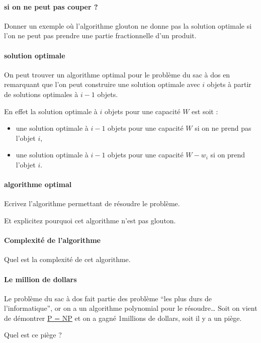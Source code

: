 \documentclass[
]{article}
\providecommand{\tightlist}{%
  \setlength{\itemsep}{0pt}\setlength{\parskip}{0pt}}
\begin{document}
\hypertarget{si-on-ne-peut-pas-couper}{%
\paragraph{si on ne peut pas couper ?}\label{si-on-ne-peut-pas-couper}}

Donner un exemple où l'algorithme glouton ne donne pas la solution
optimale si l'on ne peut pas prendre une partie fractionnelle d'un
produit.

\hypertarget{solution-optimale}{%
\paragraph{solution optimale}\label{solution-optimale}}

On peut trouver un algorithme optimal pour le problème du sac à dos en
remarquant que l'on peut construire une solution optimale avec \(i\)
objets à partir de solutions optimales à \(i-1\) objets.

En effet la solution optimale à \(i\) objets pour une capacité \(W\) est
soit :

\begin{itemize}
\tightlist
\item
  une solution optimale à \(i-1\) objets pour une capacité \(W\) si on
  ne prend pas l'objet \(i\),
\item
  une solution optimale à \(i-1\) objets pour une capacité \(W - w_i\)
  si on prend l'objet \(i\).
\end{itemize}

\hypertarget{algorithme-optimal}{%
\paragraph{algorithme optimal}\label{algorithme-optimal}}

Ecrivez l'algorithme permettant de résoudre le problème.

Et explicitez pourquoi cet algorithme n'est pas glouton.

\hypertarget{complexituxe9-de-lalgorithme}{%
\paragraph{Complexité de
l'algorithme}\label{complexituxe9-de-lalgorithme}}

Quel est la complexité de cet algorithme.

\hypertarget{le-million-de-dollars}{%
\paragraph{Le million de dollars}\label{le-million-de-dollars}}

Le problème du sac à dos fait partie des problème ``les plus durs de
l'informatique'', or on a un algorithme polynomial pour le
résoudre\ldots{} Soit on vient de démontrer
\href{https://fr.wikipedia.org/wiki/Probl\%C3\%A8mes_du_prix_du_mill\%C3\%A9naire\#Probl\%C3\%A8me_ouvert_P_=_NP}{P
= NP} et on a gagné 1millions de dollars, soit il y a un piège.

Quel est ce piège ?
\end{document}
